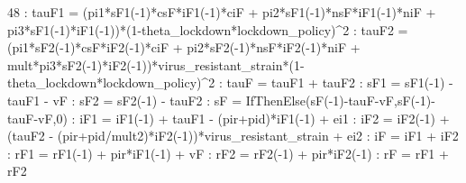 \documentclass{article}%
\begin{document}
 48   :  tauF1 = (pi1*sF1({-}1)*csF*iF1({-}1)*ciF + pi2*sF1({-}1)*nsF*iF1({-}1)*niF + pi3*sF1({-}1)*iF1({-}1))*(1{-}theta\_lockdown*lockdown\_policy)\^{}2\newline%
   :  tauF2 = (pi1*sF2({-}1)*csF*iF2({-}1)*ciF + pi2*sF2({-}1)*nsF*iF2({-}1)*niF + mult*pi3*sF2({-}1)*iF2({-}1))*virus\_resistant\_strain*(1{-}theta\_lockdown*lockdown\_policy)\^{}2\newline%
   :  tauF = tauF1 + tauF2\newline%
   :  sF1 = sF1({-}1) {-} tauF1 {-} vF\newline%
   :  sF2 = sF2({-}1) {-} tauF2\newline%
   :  sF  = IfThenElse(sF({-}1){-}tauF{-}vF,sF({-}1){-}tauF{-}vF,0)\newline%
   :  iF1 = iF1({-}1) + tauF1 {-} (pir+pid)*iF1({-}1) + ei1\newline%
   :  iF2 = iF2({-}1) + (tauF2 {-} (pir+pid/mult2)*iF2({-}1))*virus\_resistant\_strain + ei2\newline%
   :  iF = iF1 + iF2\newline%
   :  rF1 = rF1({-}1) + pir*iF1({-}1) + vF\newline%
   :  rF2 = rF2({-}1) + pir*iF2({-}1)\newline%
   :  rF  = rF1 + rF2\newline%
\newline%
\end{document}
